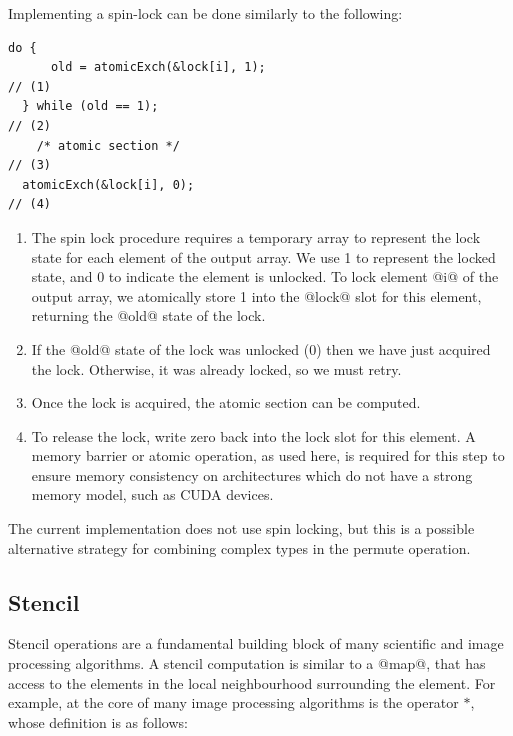 Implementing a spin-lock can be done similarly to the following:
%
\begin{lstlisting}[style=cuda]
  do {
      old = atomicExch(&lock[i], 1);                                               // (1)
  } while (old == 1);                                                              // (2)
    /* atomic section */                                                           // (3)
  atomicExch(&lock[i], 0);                                                         // (4)
\end{lstlisting}
%
\begin{enumerate}
    \item The spin lock procedure requires a temporary array to represent the
        lock state for each element of the output array. We use 1 to represent
        the locked state, and 0 to indicate the element is unlocked. To lock
        element @i@ of the output array, we atomically store 1 into the @lock@
        slot for this element, returning the @old@ state of the lock.

    \item If the @old@ state of the lock was unlocked (0) then we have just
        acquired the lock. Otherwise, it was already locked, so we must retry.

    \item Once the lock is acquired, the atomic section can be computed.

    \item To release the lock, write zero back into the lock slot for this
        element. A memory barrier or atomic operation, as used here, is required
        for this step to ensure memory consistency on architectures which do not
        have a strong memory model, such as CUDA\cuda{} devices.

\end{enumerate}

The current implementation does not use spin locking, but this is a possible
alternative strategy for combining complex types in the permute operation.


\subsection{Stencil}
\label{sec:parallel_stencil}

Stencil operations are a fundamental building block of many scientific and image
processing algorithms. A stencil computation is similar to a @map@, that has
access to the elements in the local neighbourhood surrounding the element. For
example, at the core of many image processing algorithms is the
 operator $*$, whose definition is as follows:

